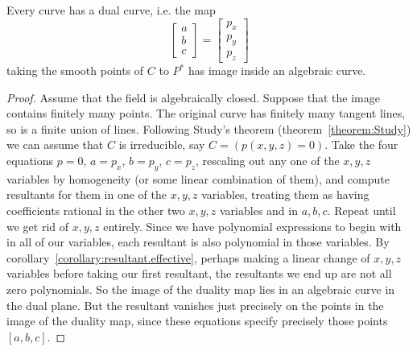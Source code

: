\begin{corollary}
Every curve has a dual curve, i.e. the map
\[
\begin{bmatrix}
a \\
b \\
c
\end{bmatrix}
=
\begin{bmatrix}
p_x \\
p_y \\
p_z
\end{bmatrix}
\]
taking the smooth points of \(C\) to \(P^*\) has image inside an algebraic curve.
\end{corollary}
\begin{proof}
Assume that the field is algebraically closed.
Suppose that the image contains finitely many points.
The original curve has finitely many tangent lines, so is a finite union of lines. 
Following Study's theorem (theorem~\vref{theorem:Study}) we can assume that \(C\) is irreducible, say \(C=(p(x,y,z)=0)\). 
Take the four equations \(p=0\), \(a=p_x\), \(b=p_y\), \(c=p_z\), rescaling out any one of the \(x,y,z\) variables by homogeneity (or some linear combination of them), and compute resultants for them in one of the \(x,y,z\) variables, treating them as having coefficients rational in the other two \(x,y,z\) variables and in \(a,b,c\). Repeat until we get rid of \(x,y,z\) entirely. Since we have polynomial expressions to begin with in all of our variables, each resultant is also polynomial in those variables. By corollary~\vref{corollary:resultant.effective}, perhaps making a linear change of \(x,y,z\) variables before taking our first resultant, the resultants we end up are not all zero polynomials. 
So the image of the duality map lies in an algebraic curve in the dual plane. But the resultant vanishes just precisely on the points in the image of the duality map, since these equations specify precisely those points \([a,b,c]\).
\end{proof}


